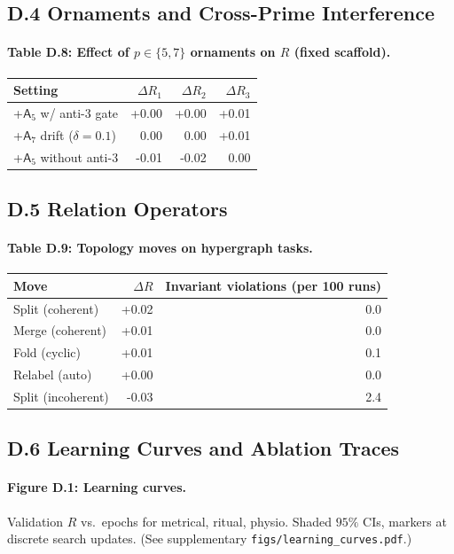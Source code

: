 \documentclass[12pt]{article}
\numberwithin{equation}{section}
\theoremstyle{plain}
\theoremstyle{definition}
\theoremstyle{remark}
\begin{document}
\subsection*{D.4 Ornaments and Cross-Prime Interference}
\paragraph{Table D.8: Effect of $p\in\{5,7\}$ ornaments on $R$ (fixed scaffold).}
\begin{tabular}{lrrr}
\toprule
Setting & $\Delta R_1$ & $\Delta R_2$ & $\Delta R_3$ \\
\midrule
+$\mathsf{A}_5$ w/ anti-$3$ gate & +0.00 & +0.00 & +0.01 \\
+$\mathsf{A}_7$ drift ($\delta=0.1$) & 0.00 & 0.00 & +0.01 \\
+$\mathsf{A}_5$ without anti-$3$     & -0.01 & -0.02 & 0.00 \\
\bottomrule
\end{tabular}

\subsection*{D.5 Relation Operators}
\paragraph{Table D.9: Topology moves on hypergraph tasks.}
\begin{tabular}{lrr}
\toprule
Move & $\Delta R$ & Invariant violations (per 100 runs) \\
\midrule
Split (coherent)  & +0.02 & 0.0 \\
Merge (coherent)  & +0.01 & 0.0 \\
Fold (cyclic)     & +0.01 & 0.1 \\
Relabel (auto)    & +0.00 & 0.0 \\
Split (incoherent) & -0.03 & 2.4 \\
\bottomrule
\end{tabular}

\subsection*{D.6 Learning Curves and Ablation Traces}
\paragraph{Figure D.1: Learning curves.}
Validation $R$ vs.\ epochs for metrical, ritual, physio. Shaded $95\%$ CIs, markers at discrete search updates. (See supplementary \texttt{figs/learning\_curves.pdf}.)
\end{document}
